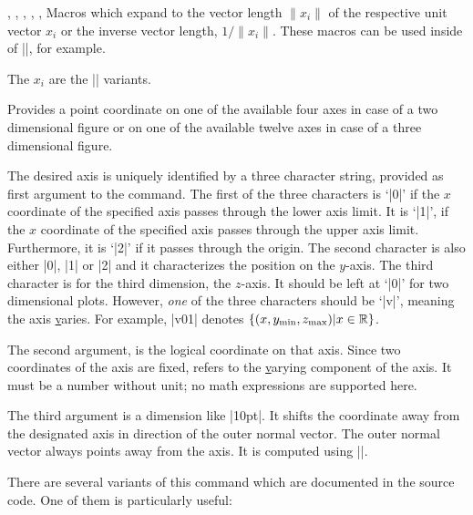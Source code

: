 \begin{commandlist}{%
    \pgfplotsunitxlength,
    \pgfplotsunitylength,
    \pgfplotsunitzlength,
    \pgfplotsunitxinvlength,
    \pgfplotsunityinvlength,
    \pgfplotsunitzinvlength%
}
    Macros which expand to the vector length $\lVert x_i \rVert$ of the
    respective unit vector $x_i$ or the inverse vector length, $1/\lVert x_i
    \rVert$. These macros can be used inside of |\pgfmathparse|, for example.

    The $x_i$ are the |\pgfplotspointunitx| variants.
\end{commandlist}

\begin{command}{\pgfplotsqpointoutsideofaxis%
}
    Provides a point coordinate on one of the available four axes in case of a
    two dimensional figure or on one of the available twelve axes in case of a
    three dimensional figure.

    The desired axis is uniquely identified by a three character string,
    provided as first argument to the command. The first of the three
    characters is `|0|' if the $x$ coordinate of the specified axis passes
    through the lower axis limit. It is `|1|', if the $x$ coordinate of the
    specified axis passes through the upper axis limit. Furthermore, it is
    `|2|' if it passes through the origin. The second character is also either
    |0|, |1| or |2| and it characterizes the position on the $y$-axis. The
    third character is for the third dimension, the $z$-axis. It should be left
    at `|0|' for two dimensional plots. However, \emph{one} of the three
    characters should be `|v|', meaning the axis \underline varies. For
    example, |v01| denotes $\{ (x,y_{\min},z_{\max}) \vert x \in \mathbb{R} \}$.

    The second argument,  is the logical coordinate on that
    axis. Since two coordinates of the axis are fixed,  refers
    to the \underline varying component of the axis. It must be a number
    without unit; no math expressions are supported here.

    The third argument  is a dimension like |10pt|. It
    shifts the coordinate away from the designated axis in direction of the
    outer normal vector. The outer normal vector always points away from the
    axis. It is computed using |\pgfplotspointouternormalvectorofaxis|.

    There are several variants of this command which are documented in the
    source code. One of them is particularly useful:
\end{command}

